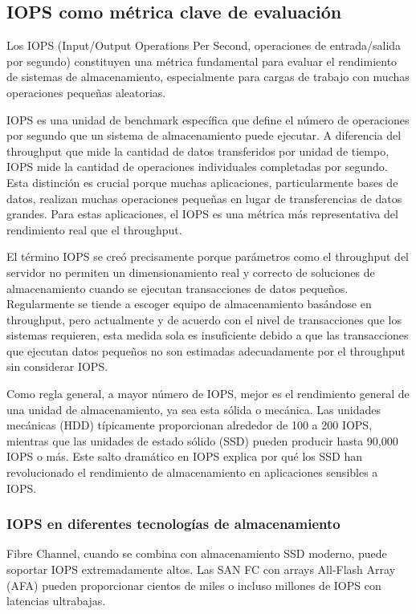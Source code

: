 \subsection{IOPS como métrica clave de evaluación}

Los IOPS (Input/Output Operations Per Second, operaciones de entrada/salida por segundo) constituyen una métrica fundamental para evaluar el rendimiento de sistemas de almacenamiento, especialmente para cargas de trabajo con muchas operaciones pequeñas aleatorias.

IOPS es una unidad de benchmark específica que define el número de operaciones por segundo que un sistema de almacenamiento puede ejecutar. A diferencia del throughput que mide la cantidad de datos transferidos por unidad de tiempo, IOPS mide la cantidad de operaciones individuales completadas por segundo. Esta distinción es crucial porque muchas aplicaciones, particularmente bases de datos, realizan muchas operaciones pequeñas en lugar de transferencias de datos grandes. Para estas aplicaciones, el IOPS es una métrica más representativa del rendimiento real que el throughput.

El término IOPS se creó precisamente porque parámetros como el throughput del servidor no permiten un dimensionamiento real y correcto de soluciones de almacenamiento cuando se ejecutan transacciones de datos pequeños. Regularmente se tiende a escoger equipo de almacenamiento basándose en throughput, pero actualmente y de acuerdo con el nivel de transacciones que los sistemas requieren, esta medida sola es insuficiente debido a que las transacciones que ejecutan datos pequeños no son estimadas adecuadamente por el throughput sin considerar IOPS.

Como regla general, a mayor número de IOPS, mejor es el rendimiento general de una unidad de almacenamiento, ya sea esta sólida o mecánica. Las unidades mecánicas (HDD) típicamente proporcionan alrededor de 100 a 200 IOPS, mientras que las unidades de estado sólido (SSD) pueden producir hasta 90,000 IOPS o más. Este salto dramático en IOPS explica por qué los SSD han revolucionado el rendimiento de almacenamiento en aplicaciones sensibles a IOPS.

\subsubsection{IOPS en diferentes tecnologías de almacenamiento}

Fibre Channel, cuando se combina con almacenamiento SSD moderno, puede soportar IOPS extremadamente altos. Las SAN FC con arrays All-Flash Array (AFA) pueden proporcionar cientos de miles o incluso millones de IOPS con latencias ultrabajas. 

